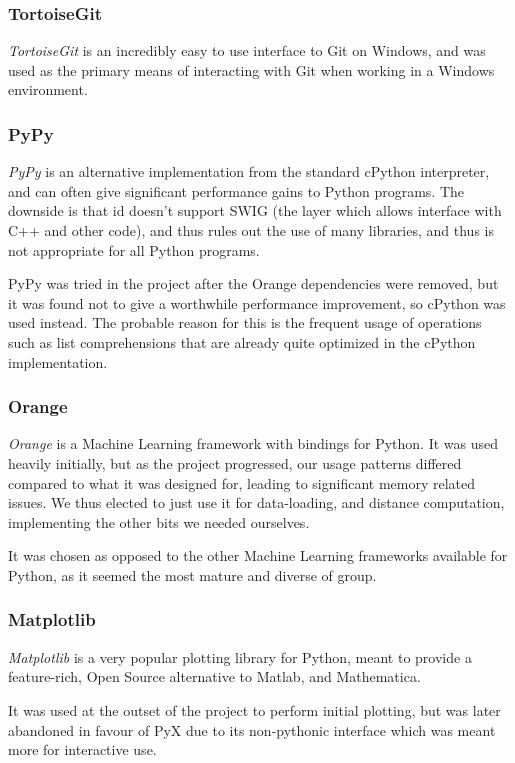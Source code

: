 \documentclass[a4paper,11pt]{report}
\begin{document}
\subsubsection*{TortoiseGit}
\emph{TortoiseGit}\citep{prog:tortoisegit} is an incredibly easy to use interface to Git on Windows, and was used as the primary means of interacting with Git when working in a Windows environment.

\subsubsection*{PyPy}
\emph{PyPy}\citep{prog:pypy} is an alternative implementation from the standard cPython interpreter, and can often give significant performance gains to Python programs. The downside is that id doesn't support SWIG (the layer which allows interface with C++ and other code), and thus rules out the use of many libraries, and thus is not appropriate for all Python programs.

PyPy was tried in the project after the Orange dependencies were removed, but it was found not to give a worthwhile performance improvement, so cPython was used instead. The probable reason for this is the frequent usage of operations such as list comprehensions that are already quite optimized in the cPython implementation.

\subsubsection*{Orange}
\emph{Orange}\citep{prog:orange} is a Machine Learning framework with bindings for Python. It was used heavily initially, but as the project progressed, our usage patterns differed compared to what it was designed for, leading to significant memory related issues. We thus elected to just use it for data-loading, and distance computation, implementing the other bits we needed ourselves.

It was chosen as opposed to the other Machine Learning frameworks available for Python, as it seemed the most mature and diverse of group.

\subsubsection*{Matplotlib}
\emph{Matplotlib}\citep{prog:matplotlib} is a very popular plotting library for Python, meant to provide a feature-rich, Open Source alternative to Matlab, and Mathematica.

It was used at the outset of the project to perform initial plotting, but was later abandoned in favour of PyX due to its non-pythonic interface which was meant more for interactive use.
\end{document}
